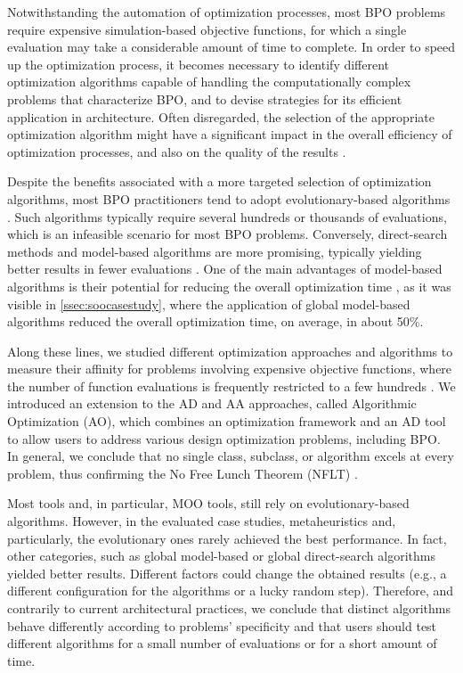 Notwithstanding the automation of optimization processes, most \ac{BPO} problems require expensive simulation-based objective functions, for which a single evaluation may take a considerable amount of time to complete. In order to speed up the optimization process, it becomes necessary to identify different optimization algorithms capable of handling the computationally complex problems that characterize \ac{BPO}, and to devise strategies for its efficient application in architecture. Often disregarded, the selection of the appropriate optimization algorithm might have a significant impact in the overall efficiency of optimization processes, and also on the quality of the results \cite{Wolpert1997NFLT}. 

Despite the benefits associated with a more targeted selection of optimization algorithms, most \ac{BPO} practitioners tend to adopt evolutionary-based algorithms \cite{Evins2013, Nguyen2014}. Such algorithms typically require several hundreds or thousands of evaluations, which is an infeasible scenario for most \ac{BPO} problems. Conversely, direct-search methods and model-based algorithms are more promising, typically yielding better results in fewer evaluations \cite{Waibel2018}. One of the main advantages of model-based algorithms is their potential for reducing the overall optimization time \cite{Wortmann2017GABESTCHOICE}, as it was visible in \cref{ssec:soocasestudy}, where the application of global model-based algorithms reduced the overall optimization time, on average, in about 50\%. 

Along these lines, we studied different optimization approaches and algorithms to measure their affinity for problems involving expensive objective functions, where the number of function evaluations is frequently restricted to a few hundreds \cite{Caetano2018,Belem2018optimizeddesign,Belem2019MOO}. We introduced an extension to the \ac{AD} and \ac{AA} approaches, called Algorithmic Optimization (\ac{AO}), which combines an optimization framework and an \ac{AD} tool to allow users to address various design optimization problems, including \ac{BPO}. In general, we conclude that no single class, subclass, or algorithm excels at every problem, thus confirming the No Free Lunch Theorem (\ac{NFLT}) \cite{Wolpert1997NFLT}.  

Most tools and, in particular, \ac{MOO} tools, still rely on evolutionary-based algorithms. However, in the evaluated case studies, metaheuristics and, particularly, the evolutionary ones rarely achieved the best performance. In fact, other categories, such as global model-based or global direct-search algorithms yielded better results. Different factors could change the obtained results (e.g., a different configuration for the algorithms or a lucky random step). Therefore, and contrarily to current architectural practices, we conclude that distinct algorithms behave differently according to  problems' specificity and that users should test different algorithms for a small number of evaluations or for a short amount of time. 

